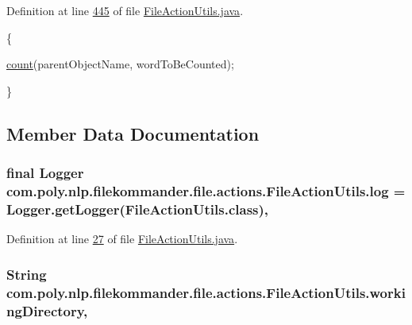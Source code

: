 Definition at line \hyperlink{L445}{445} of file \hyperlink{}{File\-Action\-Utils.\-java}.


\begin{DoxyCode}
                               \{

        \hyperlink{classcom_1_1poly_1_1nlp_1_1filekommander_1_1file_1_1actions_1_1_file_action_utils_a2df1aca8a703f77ff7ca700541d6fb6b}{count}(parentObjectName, wordToBeCounted);

    \}
\end{DoxyCode}


\subsection{Member Data Documentation}
\hypertarget{classcom_1_1poly_1_1nlp_1_1filekommander_1_1file_1_1actions_1_1_file_action_utils_a7af6d26171248a2e7253d9bce1b287cc}{
\subsubsection[{log}]{\setlength{\rightskip}{0pt plus 5cm}final Logger com.\-poly.\-nlp.\-filekommander.\-file.\-actions.\-File\-Action\-Utils.\-log = Logger.\-get\-Logger(File\-Action\-Utils.\-class)\hspace{0.3cm}{\ttfamily [static]}, {\ttfamily [private]}}}\label{classcom_1_1poly_1_1nlp_1_1filekommander_1_1file_1_1actions_1_1_file_action_utils_a7af6d26171248a2e7253d9bce1b287cc}


Definition at line \hyperlink{L27}{27} of file \hyperlink{}{File\-Action\-Utils.\-java}.

\hypertarget{classcom_1_1poly_1_1nlp_1_1filekommander_1_1file_1_1actions_1_1_file_action_utils_ad54a8fdc9145d2f423c54cb1597f874a}{
\subsubsection[{working\-Directory}]{\setlength{\rightskip}{0pt plus 5cm}String com.\-poly.\-nlp.\-filekommander.\-file.\-actions.\-File\-Action\-Utils.\-working\-Directory\hspace{0.3cm}{\ttfamily [static]}, {\ttfamily [private]}}}\label{classcom_1_1poly_1_1nlp_1_1filekommander_1_1file_1_1actions_1_1_file_action_utils_ad54a8fdc9145d2f423c54cb1597f874a}


